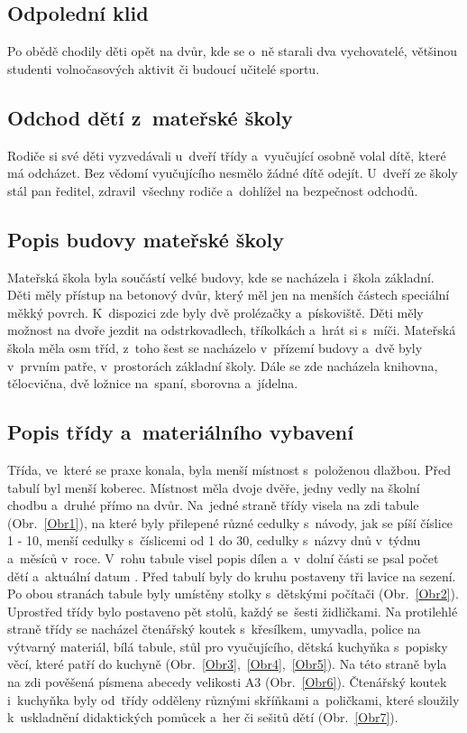 		\subsection{Odpolední klid}
		\label{spani}
			Po obědě chodily děti opět na dvůr, kde se o~ně starali dva vychovatelé, většinou studenti volnočasových aktivit či budoucí učitelé sportu.

		\subsection{Odchod dětí z~mateřské školy}
			Rodiče si své děti vyzvedávali u~dveří třídy a~vyučující osobně volal dítě, které má odcházet. Bez vědomí vyučujícího nesmělo žádné dítě odejít. U~dveří ze školy stál pan ředitel, zdravil všechny rodiče a~dohlížel na bezpečnost odchodů. 

		\subsection{Popis budovy mateřské školy}

			Mateřská škola byla součástí velké budovy, kde se nacházela i~škola základní. Děti měly přístup na betonový dvůr, který měl jen na menších částech speciální měkký povrch. K~dispozici zde byly dvě prolézačky a~pískoviště. Děti měly možnost na dvoře jezdit na odstrkovadlech, tříkolkách a~hrát si s~míči. 
			Mateřská škola měla osm tříd, z~toho šest se nacházelo v přízemí budovy a~dvě byly v prvním patře, v prostorách základní školy. Dále se zde nacházela knihovna, tělocvična, dvě ložnice na spaní, sborovna a~jídelna. 

		\subsection{Popis třídy a~materiálního vybavení}
		\label{tridaVybaveni}
			Třída, ve které se praxe konala, byla menší místnost s~položenou dlažbou. Před tabulí byl menší koberec. Místnost měla dvoje dvěře, jedny vedly na školní chodbu a~druhé přímo na dvůr.
			Na jedné straně třídy visela na zdi tabule (Obr.~\ref{Obr1}), na které byly přilepené různé cedulky s návody, jak se píší číslice 1 - 10, menší cedulky s~číslicemi od 1 do 30, cedulky s~názvy dnů v týdnu a~měsíců v~roce. V~rohu tabule visel popis dílen a~v~dolní části se psal počet dětí a~aktuální datum . Před tabulí byly do kruhu postaveny tři lavice na sezení. Po obou stranách tabule byly umístěny stolky s dětskými počítači (Obr.~\ref{Obr2}). Uprostřed třídy bylo postaveno pět stolů, každý se šesti židličkami. Na protilehlé straně třídy se nacházel čtenářský koutek s křesílkem, umyvadla, police na výtvarný materiál, bílá tabule, stůl pro vyučujícího, dětská kuchyňka s popisky věcí, které patří do kuchyně (Obr.~\ref{Obr3},~\ref{Obr4},~\ref{Obr5}). Na této straně byla na zdi pověšená písmena abecedy velikosti A3 (Obr.~\ref{Obr6}). Čtenářský koutek i~kuchyňka byly od třídy odděleny různými skříňkami a~poličkami, které sloužily k uskladnění didaktických pomůcek a~her či sešitů dětí (Obr.~\ref{Obr7}).

